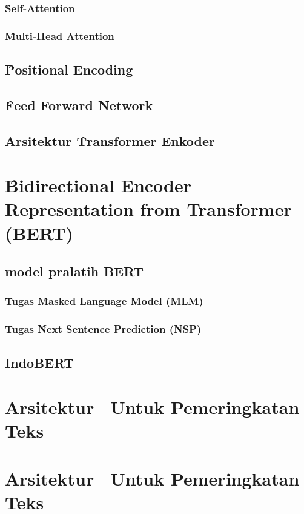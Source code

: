 \subsubsection{\f{Self-Attention}}


\subsubsection{\f{Multi-Head Attention}}
\subsection{\f{Positional Encoding}}
\subsection{\f{Feed Forward Network}}
\subsection{Arsitektur \f{Transformer} Enkoder}

\section{\f{Bidirectional Encoder Representation from Transformer (BERT)}}
\subsection{model pralatih BERT}
\subsubsection{Tugas \f{Masked Language Model (MLM)}}
\subsubsection{Tugas \f{Next Sentence Prediction (NSP)}}
\subsection{IndoBERT}
\section{Arsitektur \bertcat~Untuk Pemeringkatan Teks}
\section{Arsitektur \bertdot~Untuk Pemeringkatan Teks}



